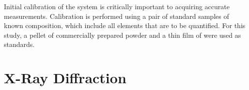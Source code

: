 Initial calibration of the system is critically important to acquiring accurate measurements. Calibration is performed using a pair of standard samples of known composition, which include all elements that are to be quantified. For this study, a pellet of commercially prepared \PTO{} powder and a thin film of  were used as standards. 


\section{X-Ray Diffraction}
\label{sec:Methods-XRD}

\lipsum


%





